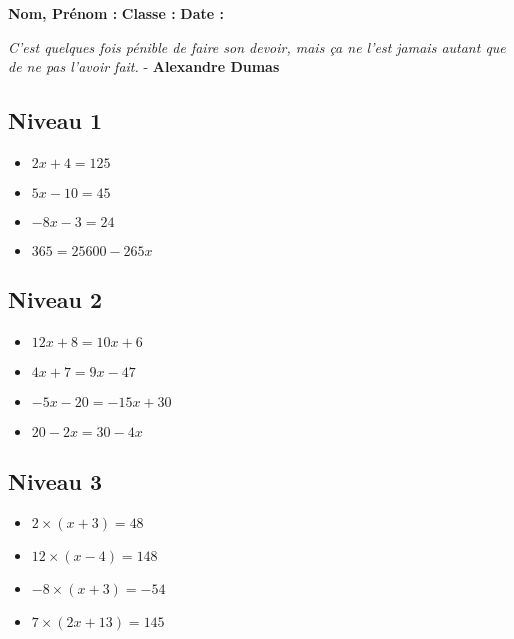 



\textbf{Nom, Prénom :} \hspace{8cm} \textbf{Classe :} \hspace{3cm} \textbf{Date :}\\

\begin{center}
  \textit{C'est quelques fois pénible de faire son devoir, mais ça ne l'est jamais autant que de ne pas l'avoir fait.} - \textbf{Alexandre Dumas}
\end{center}


\begin{multicols}{3}

\subsection*{Niveau 1}

\begin{itemize}[label={$\bullet$}]
  \item $2x + 4 = 125$ \\
  \item $5x - 10 = 45$ \\
  \item $-8x - 3 = 24$ \\
  \item $365 = 25 600 - 265x$
\end{itemize} \columnbreak

\subsection*{Niveau 2}

\begin{itemize}[label={$\bullet$}]
  \item $12x + 8 = 10x + 6$ \\
  \item $4x + 7 = 9x - 47$ \\
  \item $-5x - 20 = - 15x +30$ \\
  \item $20 - 2x = 30 - 4x$
\end{itemize} \columnbreak


\subsection*{Niveau 3}

\begin{itemize}[label={$\bullet$}]
  \item $2 \times (x+3) = 48$ \\
  \item $12 \times (x-4) = 148$ \\
  \item $-8 \times (x+3) = -54$ \\
  \item $7 \times (2x+13) = 145$
\end{itemize}

\end{multicols}

